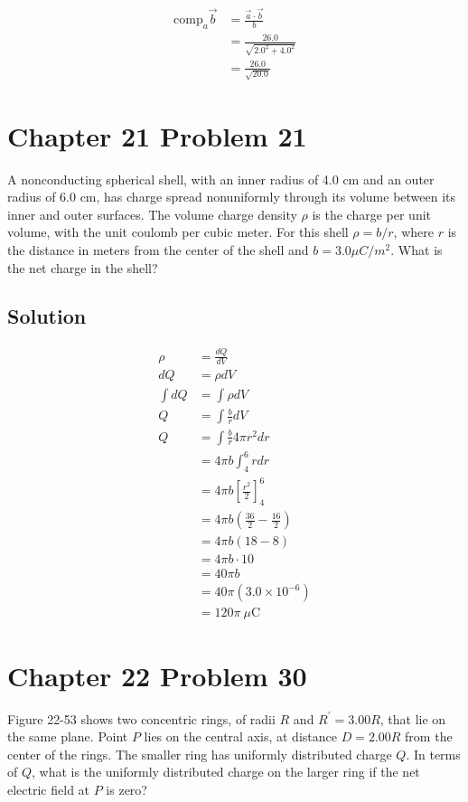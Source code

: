 \documentclass{article}
\newcommand{\C}{\text{C}}
\begin{document}
\begin{align*}
\text{comp}_{a}\vec{b} &= \frac{\vec{a} \cdot \vec{b}}{b} \\
&= \frac{26.0}{\sqrt{2.0^2 + 4.0^2}} \\
&= \boxed{\frac{26.0}{\sqrt{20.0}}}
\end{align*}

\section*{Chapter 21 Problem 21}
A nonconducting spherical shell, with an inner radius of 4.0 cm and an outer radius of 6.0 cm, has charge spread nonuniformly through its volume between its inner and outer surfaces.
The volume charge density $\rho$ is the charge per unit volume, with the unit coulomb per cubic meter. For this shell $\rho = b/r$, where $r$ is the distance in meters from the center of the shell and $b = 3.0 \mu C/m^2$.
What is the net charge in the shell?

\subsection*{Solution}

\begin{align*}
    \rho &= \frac{dQ}{dV} \\
    dQ &= \rho dV \\
    \int dQ &= \int \rho dV \\
    Q &= \int \frac{b}{r} dV \\
    Q &= \int \frac{b}{r} 4\pi r^2 dr \\
    &= 4\pi b \int_4^6 r dr \\
    &= 4\pi b \left[\frac{r^2}{2}\right]_4^6 \\
    &= 4\pi b \left(\frac{36}{2} - \frac{16}{2}\right) \\
    &= 4\pi b \left(18 - 8\right) \\
    &= 4\pi b \cdot 10 \\
    &= 40\pi b \\
    &= 40\pi (3.0 \times 10^{-6}) \\
    &= \boxed{120\pi\ \mu \C}
\end{align*}

\section*{Chapter 22 Problem 30}
Figure 22-53 shows two concentric rings, of radii $R$ and $R^\prime = 3.00R$, that lie on the same plane. 
Point $P$ lies on the central axis, at distance $D = 2.00R$ from the center of the rings. 
The smaller ring has uniformly distributed charge $Q$. 
In terms of $Q$, what is the uniformly distributed charge on the larger ring if the net electric field at $P$ is zero?
\end{document}
